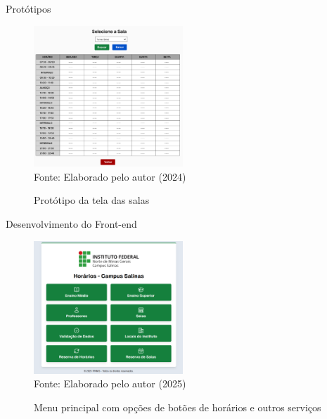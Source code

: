 \begin{frame}{Protótipos}
    \begin{figure}
        \centering
        \vspace{-0.5cm}
        \caption{Protótipo da tela das salas}
        \vspace{-0.2cm}
        \includegraphics[width=0.5\textwidth]{figuras/proto-5.png}
        \\ %
        \small Fonte: Elaborado pelo autor (2024)
    \end{figure}
\end{frame}

\begin{frame}{Desenvolvimento do Front-end}
    \begin{figure}
        \centering
        \vspace{-0.5cm}
        \caption{Menu principal com opções de botões de horários e outros serviços}
        \vspace{-0.2cm}
        \includegraphics[width=0.5\textwidth]{figuras/front-1.png}
        \\ %
        \small Fonte: Elaborado pelo autor (2025)
    \end{figure}
\end{frame}

